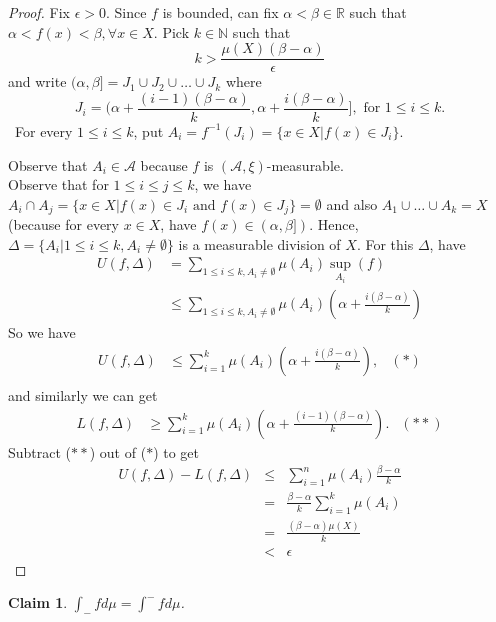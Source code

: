 \documentclass[letterpaper, 12pt]{article}
\newcommand{\bR}{\mathbb{R}}
\newcommand{\bN}{\mathbb{N}}
\newcommand{\sA}{\mathcal{A}}
\theoremstyle{stdthm}
\theoremstyle{stddef}
\theoremstyle{stdnonum}
\newtheorem{claim}{Claim}
\theoremstyle{stdqands}
\theoremstyle{stdbold}
\begin{document}
\begin{proof}
Fix $\epsilon >0 $. Since $f$ is bounded, can fix $\alpha < \beta \in \bR$ such that $\alpha < f(x)<\beta, \forall x \in X$. Pick $k \in \bN$ such that 
\[k > \frac{\mu(X)(\beta - \alpha)}{\epsilon} \]
and write $(\alpha,\beta] = J_1\cup J_2 \cup \dots \cup J_k$ where
\[J_i = \bigg(\alpha + \frac{(i-1)(\beta - \alpha)}{k}, \alpha + \frac{i(\beta - \alpha)}{k}\bigg], \text{ for } 1 \leq i \leq k. \]\
For every $1\leq i \leq k$, put $A_i = f^{-1}(J_i) = \{x \in X|f(x) \in J_i\}$. 

Observe that $A_i \in \sA$ because $f$ is $(\sA,\xi)$-measurable. \\

Observe that for $1\leq i\leq j \leq k$, we have $A_i \cap A_j = \{x \in X| f(x) \in J_i \text{ and } f(x) \in J_j\} = \emptyset$ and also $A_1\cup \dots \cup A_k = X$ (because for every $x\in X$, have $f(x) \in (\alpha,\beta])$. Hence, $\Delta = \{A_i|1\leq i\leq k, A_i \neq \emptyset \}$ is a measurable division of $X$. For this $\Delta$, have 
\begin{align*}
 U(f,\Delta) &= \sum_{1\leq i \leq k, A_i \neq \emptyset} \mu(A_i)\sup_{A_i}(f)\\
 & \leq \sum_{1\leq i\leq k, A_i \neq \emptyset} \mu(A_i)\left(\alpha +  \frac{i(\beta - \alpha)}{k} \right)
\end{align*}
So we have 
\begin{align*}
U(f,\Delta) &\leq \sum_{i=1}^k \mu(A_i)\left( \alpha + \frac{i(\beta - \alpha)}{k} \right), &(*)\\
\end{align*}
and similarly we can get
\begin{align*}
L(f,\Delta) &\geq \sum_{i=1}^k \mu(A_i) \left( \alpha + \frac{(i-1)(\beta - \alpha)}{k} \right). &(**)
\end{align*}
Subtract ($**$) out of ($*$) to get
\begin{eqnarray*}
U(f,\Delta) - L(f,\Delta) &\leq& \sum_{i=1}^n \mu(A_i) \frac{\beta - \alpha}{k}\\
&=& \frac{\beta - \alpha}{k} \sum_{i=1}^k \mu(A_i)\\
&=& \frac{(\beta - \alpha)\mu(X)}{k}\\
&<& \epsilon
\end{eqnarray*}
\end{proof}

\begin{claim}
$\int_{-}fd\mu = \int^{-}fd\mu$. 
\end{claim}
\end{document}
